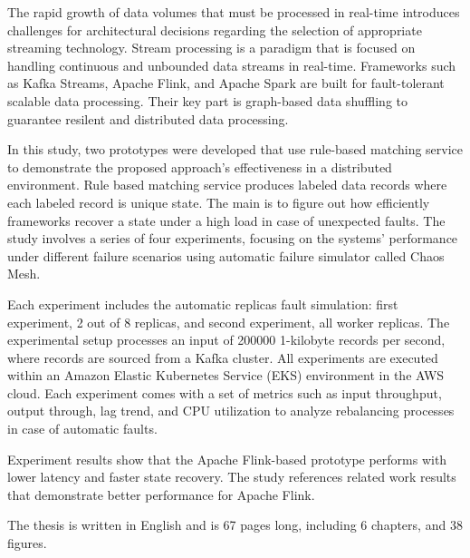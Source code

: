 The rapid growth of data volumes that must be processed in real-time introduces
challenges for architectural decisions regarding the selection of appropriate streaming technology.
Stream processing is a paradigm that is focused on handling continuous and unbounded data streams in real-time.
Frameworks such as Kafka Streams, Apache Flink, and Apache Spark are built for fault-tolerant scalable data processing.
Their key part is graph-based data shuffling to guarantee resilent and distributed data processing.

In this study, two prototypes were developed that use
rule-based matching service to demonstrate the proposed approach's effectiveness in a distributed environment.
Rule based matching service produces labeled data records where each labeled record is unique state.
The main is to figure out how efficiently frameworks recover a state under a high load in case of unexpected faults.
The study involves a series of four experiments, focusing on the systems' performance under
different failure scenarios using automatic failure simulator called Chaos Mesh.

Each experiment includes the automatic replicas fault simulation: first experiment, 2 out of 8 replicas, and second experiment, all worker replicas.
The experimental setup processes an input of 200000 1-kilobyte records per second,
where records are sourced from a Kafka cluster.
All experiments are executed within an Amazon Elastic Kubernetes Service (EKS) environment in the AWS cloud.
Each experiment comes with a set of metrics such as input throughput, output through, lag trend,
and CPU utilization to analyze rebalancing processes in case of automatic faults.

Experiment results show that the Apache Flink-based prototype performs with lower latency and faster state recovery.
The study references related work results that demonstrate better performance for Apache Flink.

The thesis is written in English and is 67 pages long, including 6 chapters, and 38 figures.

